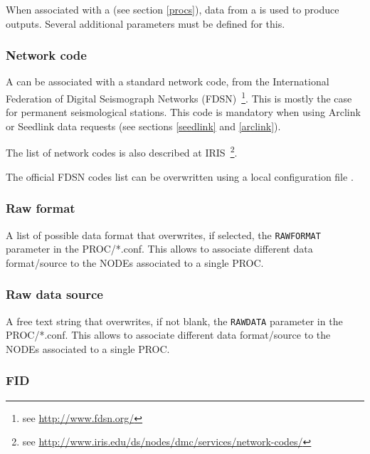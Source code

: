 When associated with a  (see section \ref{procs}), data from a  is used to produce outputs. Several additional parameters must be defined for this.


\subsubsection{Network code}

A  can be associated with a standard network code, from the International Federation of Digital Seismograph Networks (FDSN)~\footnote{see \url{http://www.fdsn.org/}}. This is mostly the case for permanent seismological stations. This code is mandatory when using Arclink or Seedlink data requests (see sections \ref{seedlink} and \ref{arclink}).

The list of network codes is also described at IRIS~\footnote{see \url{http://www.iris.edu/ds/nodes/dmc/services/network-codes/}}.

The official FDSN codes list can be overwritten using a local configuration file .

\subsubsection{Raw format}

A list of possible data format that overwrites, if selected, the \texttt{RAWFORMAT} parameter in the PROC/*.conf. This allows to associate different data format/source to the NODEs associated to a single PROC.


\subsubsection{Raw data source}

A free text string that overwrites, if not blank, the \texttt{RAWDATA} parameter in the PROC/*.conf. This allows to associate different data format/source to the NODEs associated to a single PROC.


\subsubsection{FID}

